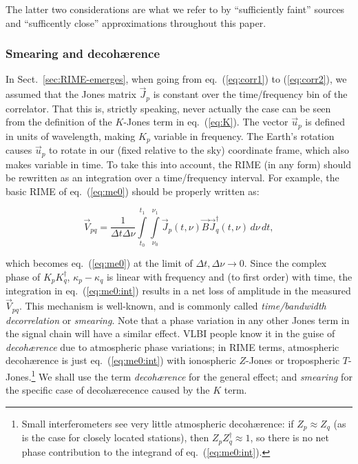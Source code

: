 \documentclass[]{aa}
\begin{document}
The latter two considerations are what we refer to by ``sufficiently faint'' sources and ``sufficently close'' approximations throughout this paper.

\subsubsection{\label{sec:smearing}Smearing and decoh{\ae}rence}

In Sect.~\ref{sec:RIME-emerges}, when going from eq.~(\ref{eq:corr1}) to (\ref{eq:corr2}), we assumed that the Jones matrix $\vec J_p$ is constant over the time/frequency bin of the correlator. That this is, strictly speaking, never actually the case can be seen from the definition of the $K$-Jones term in eq.~(\ref{eq:K}). The vector $\vec u_p$ is defined in units of wavelength, making $K_p$ variable in frequency. The Earth's rotation causes $\vec u_p$ to rotate in our (fixed relative to the sky) coordinate frame, which also makes variable in time. To take this into account, the RIME (in any form) should be rewritten as an integration over a time/frequency interval. For example, the basic RIME of eq.~(\ref{eq:me0}) should be properly written as:

\begin{equation}\label{eq:me0:int}
\vec V_{pq} = \frac{1}{\Delta t\Delta\nu}\int\limits^{t_1}_{t_0} \int\limits^{\nu_1}_{\nu_0} \vec J_p (t,\nu) \vec B  \vec J^\dagger_q(t,\nu) \, d\nu\,dt,
\end{equation}

which becomes eq.~(\ref{eq:me0}) at the limit of $\Delta t,\Delta\nu \to 0$. Since the complex phase of $K_pK^\dagger_q$, $\kappa_p-\kappa_q$ is linear with frequency and (to first order) with time, the integration in eq.~(\ref{eq:me0:int}) results in a net loss of amplitude in the measured $\vec V_{pq}$. This mechanism is well-known, and is commonly called {\em time/bandwidth decorrelation} or {\em smearing}. Note that a phase variation in any other Jones term in the signal chain will have a similar effect. VLBI people know it in the guise of {\em decoh{\ae}rence} due to atmospheric phase variations; in RIME terms, atmospheric decoh{\ae}rence is just eq.~(\ref{eq:me0:int}) with ionospheric $Z$-Jones or tropospheric $T$-Jones.\footnote{Small interferometers see very little atmospheric decoh{\ae}rence: if $Z_p\approx Z_q$ (as is the case for closely located stations), then $Z_p Z^\dagger_q \approx 1$, so there is no net phase contribution to the integrand of eq.~(\ref{eq:me0:int}).} We shall use the term {\em decoh{\ae}rence} for the general effect; and {\em smearing} for the specific case of decoh{\ae}recence caused by the $K$ term.
\end{document}
